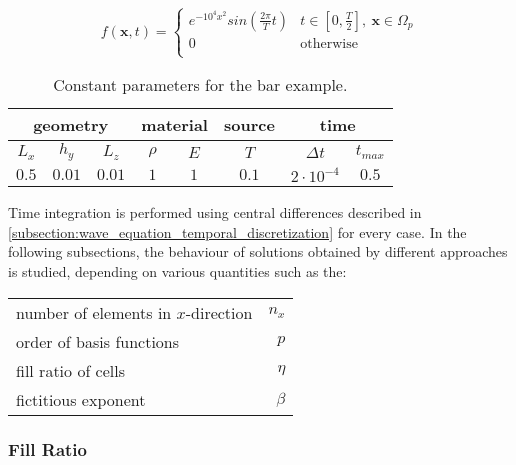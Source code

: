 \begin{equation} \label{eq:axis_aligned_source}
	f(\mathbf x,t) = \begin{cases}
	e^{-10^4x^2} sin \left( \frac{2 \pi}{T} t \right) & t \in \left[ 0,\frac{T}{2} \right], \ \mathbf x \in \Omega_p \\[0.5em]
	0 & \text{otherwise} \\
	\end{cases}
\end{equation}

\begin{table}[h]
	\centering
	\bgroup
	\def\arraystretch{1.5}
	\begin{tabular}{|c|c|c|c|c|c|c|c|}
		\hline
		\multicolumn{3}{|c}{geometry} & \multicolumn{2}{|c}{material} & \multicolumn{1}{|c}{source} & \multicolumn{2}{|c|}{time} \\
		\hline \hline
		$L_x$ & $h_y$ & $L_z$ & $\rho$ & $E$ & $T$ & $\Delta t$ & $t_{max}$ \\
		\hline
		$0.5$ & $0.01$ & $0.01$ & $1$ & $1$ & $0.1$ & $2\cdot 10^{-4}$ & $0.5$ \\
		\hline
	\end{tabular}
	\egroup
	\caption{Constant parameters for the bar example.}
\end{table}

Time integration is performed using central differences described in \ref{subsection:wave_equation_temporal_discretization} for every case. In the following subsections, the behaviour of solutions obtained by different approaches is studied, depending on various quantities such as the:

\begin{tabular}{>{\textbullet\hspace{\labelsep}}lr}
	number of elements in $x$-direction & $n_x$ \\
	order of basis functions & $p$ \\
	fill ratio of cells & $\eta$ \\
	fictitious exponent & $\beta$
\end{tabular}\bigskip

\subsubsection*{Fill Ratio}
\label{section:fill_ratio}

